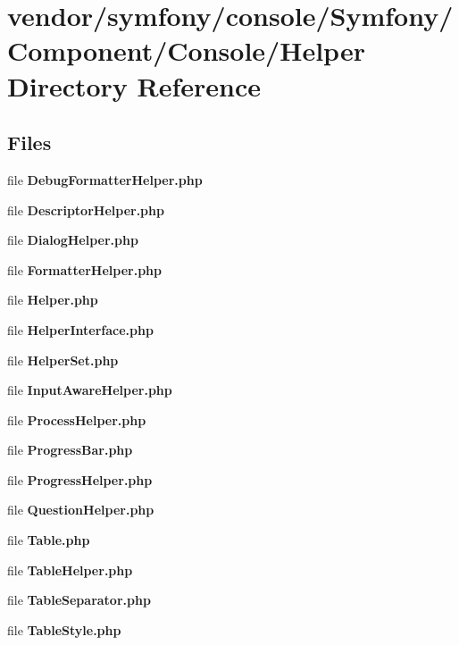 \section{vendor/symfony/console/\+Symfony/\+Component/\+Console/\+Helper Directory Reference}
\label{dir_d3f56a8dd40667624b0a500da495a027}
\subsection*{Files}
\begin{DoxyCompactItemize}
\item 
file {\bf Debug\+Formatter\+Helper.\+php}
\item 
file {\bf Descriptor\+Helper.\+php}
\item 
file {\bf Dialog\+Helper.\+php}
\item 
file {\bf Formatter\+Helper.\+php}
\item 
file {\bf Helper.\+php}
\item 
file {\bf Helper\+Interface.\+php}
\item 
file {\bf Helper\+Set.\+php}
\item 
file {\bf Input\+Aware\+Helper.\+php}
\item 
file {\bf Process\+Helper.\+php}
\item 
file {\bf Progress\+Bar.\+php}
\item 
file {\bf Progress\+Helper.\+php}
\item 
file {\bf Question\+Helper.\+php}
\item 
file {\bf Table.\+php}
\item 
file {\bf Table\+Helper.\+php}
\item 
file {\bf Table\+Separator.\+php}
\item 
file {\bf Table\+Style.\+php}
\end{DoxyCompactItemize}
